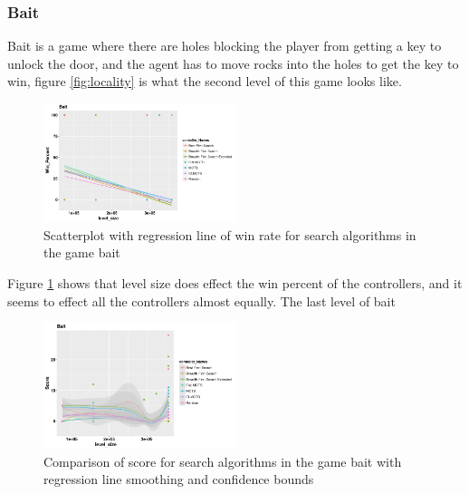 \documentclass[journal]{IEEEtran}
\begin{document}
		\subsubsection{Bait}
		Bait is a game where there are holes blocking the player from getting a key to unlock the door, and the agent has to move rocks into the holes to get the key to win, figure \ref{fig:locality} is what the second level  of this game looks like.
		\begin{figure}[h]
		    \centering
		    \includegraphics[width=0.5\textwidth]{Scatter/game_0_win}
		    \caption{ Scatterplot with regression line of win rate for search algorithms in the game bait }
		    \label{fig:game_0_win}
		\end{figure}
	Figure \ref{fig:game_0_win} shows that level size does effect the win percent of the controllers, and it seems to effect all the controllers almost equally. The last level of bait
		\begin{figure}[h]
		    \centering
		    \includegraphics[width=0.5\textwidth]{Scatter/game_0_score_smoothing_confidence}
		    \caption{ Comparison of score for search algorithms in the game bait with regression line smoothing and confidence bounds}
		    \label{fig:game_0_win_smoothing}
		\end{figure}


\end{document}
